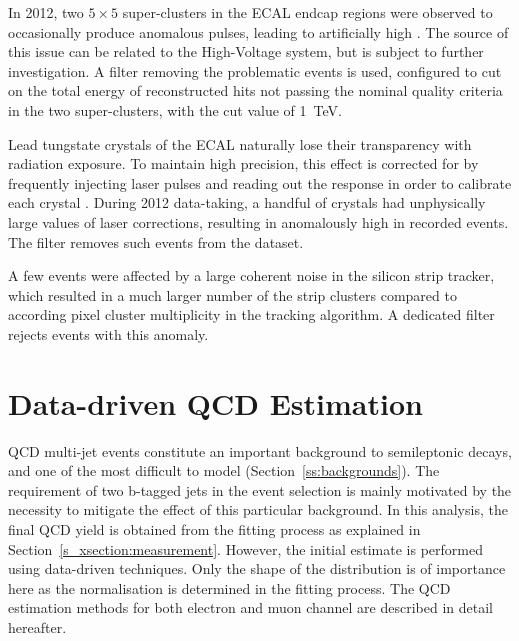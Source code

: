 \begin{description}[wide=\parindent]
	\item[Bad ECAL endcap super-cluster filter.] In 2012, two $5\times5$ super-clusters in the ECAL endcap regions were
	observed to occasionally produce anomalous pulses, leading to artificially high \MET. The source of this issue can
	be related to the High-Voltage system, but is subject to further investigation. A filter removing the problematic
	events is used, configured to cut on the total energy of reconstructed hits not passing the nominal quality criteria
	in the two super-clusters, with the cut value of \SI{1}{\TeV}.

	\item[ECAL laser correction filter.] Lead tungstate crystals of the ECAL naturally lose their transparency with
	radiation exposure. To maintain high precision, this effect is corrected for by frequently injecting laser pulses
	and reading out the response in order to calibrate each crystal \autocite{CMS_TDR1}. During 2012 data-taking, a
	handful of crystals had unphysically large values of laser corrections, resulting in anomalously high \MET in
	recorded events. The filter removes such events from the dataset.

	\item[Strip tracker noise filter.] A few events were affected by a large coherent noise in the silicon strip
	tracker, which resulted in a much larger number of the strip clusters compared to according pixel cluster
	multiplicity in the tracking algorithm. A dedicated filter rejects events with this anomaly.

\end{description}


\section{Data-driven QCD Estimation}
\label{s_xsection:data_driven_QCD}
QCD multi-jet events constitute an important background to semileptonic \ttbar decays, and one of the most difficult to
model (Section~\ref{ss:backgrounds}). The requirement of two b-tagged jets in the event selection is mainly motivated by
the necessity to mitigate the effect of this particular background. In this analysis, the final QCD yield is obtained
from the fitting process as explained in Section~\ref{s_xsection:measurement}. However, the initial estimate is
performed using data-driven techniques. Only the shape of the distribution is of importance here as the normalisation is
determined in the fitting process. The QCD estimation methods for both electron and muon channel are described in detail
hereafter.

